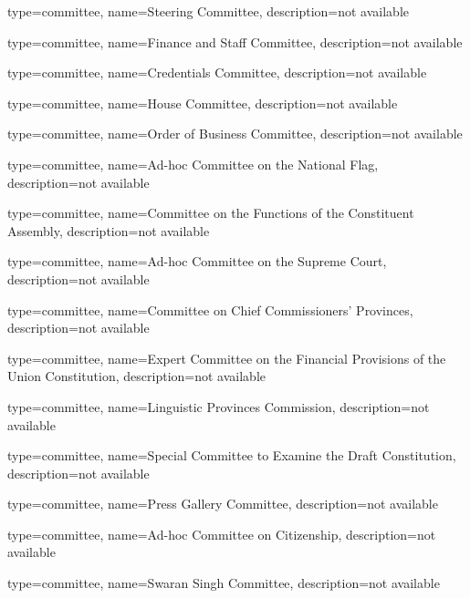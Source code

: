 {	type=committee,
  name={Steering Committee},
  description={not available}
}



{	type=committee,
  name={Finance and Staff Committee},
  description={not available}
}

{	type=committee,
  name={Credentials Committee},
  description={not available}
}

{	type=committee,
  name={House Committee},
  description={not available}
}

{	type=committee,
  name={Order of Business Committee},
  description={not available}
}

{	type=committee,
  name={Ad-hoc Committee on the National Flag},
  description={not available}
}

{	type=committee,
  name={Committee on the Functions of the Constituent Assembly},
  description={not available}
}

{	type=committee,
  name={Ad-hoc Committee on the Supreme Court},
  description={not available}
}

{	type=committee,
  name={Committee on Chief Commissioners’ Provinces},
  description={not available}
}

{	type=committee,
  name={Expert Committee on the Financial Provisions of the Union Constitution},
  description={not available}
}

{	type=committee,
  name={Linguistic Provinces Commission},
  description={not available}
}

{	type=committee,
  name={Special Committee to Examine the Draft Constitution},
  description={not available}
}

{	type=committee,
  name={Press Gallery Committee},
  description={not available}
}

{	type=committee,
  name={Ad-hoc Committee on Citizenship},
  description={not available}
}

% 

{	type=committee,
  name={Swaran Singh Committee},
  description={not available}
}



